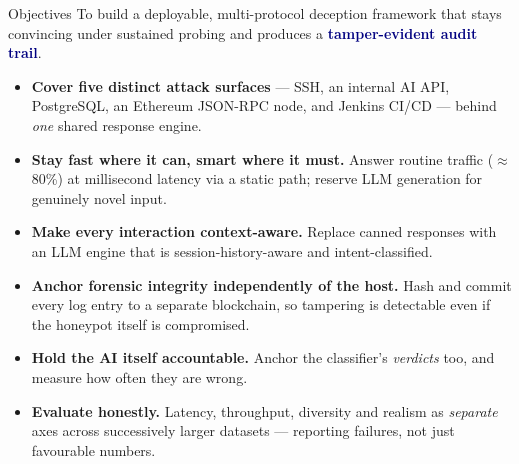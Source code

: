 \documentclass[aspectratio=169,11pt]{beamer}
\newcommand{\hl}[1]{\textcolor{navy}{\textbf{#1}}}
\begin{document}
\begin{frame}{Objectives}
  \footnotesize
  To build a deployable, multi-protocol deception framework that stays convincing under
  sustained probing and produces a \hl{tamper-evident audit trail}.
  \vspace{3pt}
  \begin{itemize}\setlength\itemsep{2pt}
    \item \textbf{Cover five distinct attack surfaces} --- SSH, an internal AI API, PostgreSQL,
      an Ethereum JSON-RPC node, and Jenkins CI/CD --- behind \emph{one} shared response engine.
    \item \textbf{Stay fast where it can, smart where it must.} Answer routine traffic
      ($\approx$80\%) at millisecond latency via a static path; reserve LLM generation for
      genuinely novel input.
    \item \textbf{Make every interaction context-aware.} Replace canned responses with an
      LLM engine that is session-history-aware and intent-classified.
    \item \textbf{Anchor forensic integrity independently of the host.} Hash and commit every
      log entry to a separate blockchain, so tampering is detectable even if the honeypot
      itself is compromised.
    \item \textbf{Hold the AI itself accountable.} Anchor the classifier's \emph{verdicts} too,
      and measure how often they are wrong.
    \item \textbf{Evaluate honestly.} Latency, throughput, diversity and realism as
      \emph{separate} axes across successively larger datasets --- reporting failures, not just
      favourable numbers.
  \end{itemize}
\end{frame}
\end{document}
